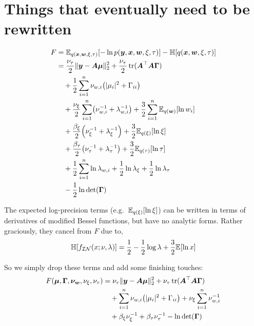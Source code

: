 \documentclass{article}
\numberwithin{equation}{section}
\newcommand{\lh}{\mathopen{}\mathclose\bgroup\left}
\newcommand{\rh}{\aftergroup\egroup\right}
\newcommand{\entropy}[1]{\mathbb{H}\lh[ #1 \rh]}
\newcommand{\E}[2]{\mathbb{E}_{#2}\lh[ #1 \rh]}
\newcommand{\m}[1]{\boldsymbol{#1}}
\DeclareMathOperator{\trace}{tr}
\begin{document}
\clearpage
\appendix
\section{Things that eventually need to be rewritten}
\begin{equation*}
\begin{aligned}
F &=
 \E{-\ln p(\m{y}, \m{x}, \m{w}, \xi, \tau)}{q(\m{x}, \m{w}, \xi, \tau)}
 -\entropy{q(\m{x}, \m{w}, \xi, \tau)}
\\ &=
  \frac{\nu_\tau}{2} \| \m{y} - \m{A} \m{\mu} \|_2^2
 +\frac{\nu_\tau}{2} \trace(\m{A}^\top \m{A} \m{\Gamma})
\\ &\quad
 +\frac{1}{2} \sum_{i=1}^n \nu_{w,i} \lh( |\mu_i|^2 + \Gamma_{ii} \rh)
\\ &\quad
 +\frac{\nu_\xi}{2} \sum_{i=1}^n \lh( \nu_{w,i}^{-1} + \lambda_{w,i}^{-1} \rh)
 + \frac{3}{2} \sum_{i=1}^n \E{\ln w_i}{q(\m{w})}
\\ &\quad
 +\frac{\beta_\xi}{2} \lh( \nu_\xi^{-1} + \lambda_\xi^{-1} \rh)
 +\frac{3}{2} \E{\ln \xi}{q(\xi)}
\\ &\quad
 +\frac{\beta_\tau}{2} \lh( \nu_\tau^{-1} + \lambda_\tau^{-1} \rh)
 +\frac{3}{2} \E{\ln \tau}{q(\tau)}
\\ &\quad
 +\frac{1}{2} \sum_{i=1}^n \ln\lambda_{w,i}
 +\frac{1}{2} \ln\lambda_\xi
 +\frac{1}{2} \ln\lambda_\tau
\\ &\quad
 -\frac{1}{2} \ln\det(\m{\Gamma})
\end{aligned}
\end{equation*}

The expected log-precision terms (e.g.~$\E{\ln\xi}{q(\xi)}$) can be
written in terms of derivatives of modified Bessel functions, but
have no analytic forms. Rather graciously, they cancel from $F$
due to,
\begin{equation}
\entropy{f_{\mathcal{IN}}(x; \nu, \lambda)} =
 \frac{1}{2} - \frac{1}{2} \log\lambda
 + \frac{3}{2} \E{\ln x}{}
\end{equation}

So we simply drop these terms and add some finishing touches:
\begin{equation*}
\begin{aligned}
F(\m{\mu}, \m{\Gamma}, \m{\nu_w}, \nu_\xi, \nu_\tau) &=
  \nu_\tau \| \m{y} - \m{A} \m{\mu} \|_2^2
 +\nu_\tau \trace(\m{A}^\top \m{A} \m{\Gamma})
\\ &\quad
 +\sum_{i=1}^n \nu_{w,i} \lh( |\mu_i|^2 + \Gamma_{ii} \rh)
 +\nu_\xi \sum_{i=1}^n \nu_{w,i}^{-1}
\\ &\quad
 +\beta_\xi \nu_\xi^{-1}
 +\beta_\tau \nu_\tau^{-1}
 -\ln\det(\m{\Gamma})
\end{aligned}
\end{equation*}
\end{document}
